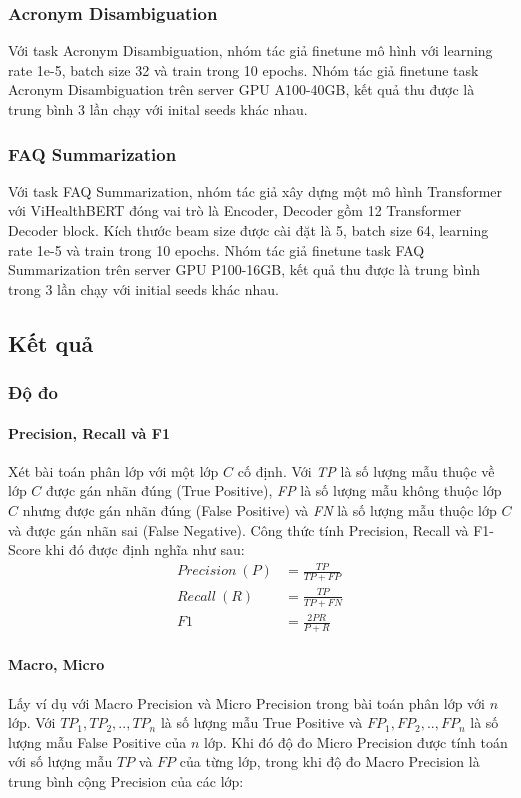 \subsubsection{Acronym Disambiguation}
Với task Acronym Disambiguation, nhóm tác giả finetune mô hình với learning rate 1e-5, batch size 32 và train trong 10 epochs. Nhóm tác giả finetune task Acronym Disambiguation trên server GPU A100-40GB, kết quả thu được là trung bình 3 lần chạy với inital seeds khác nhau.

\subsubsection{FAQ Summarization}
Với task FAQ Summarization, nhóm tác giả xây dựng một mô hình Transformer với ViHealthBERT đóng vai trò là Encoder, Decoder gồm 12 Transformer Decoder block. Kích thước beam size được cài đặt là 5, batch size 64, learning rate 1e-5 và train trong 10 epochs. Nhóm tác giả finetune task FAQ Summarization trên server GPU P100-16GB, kết quả thu được là trung bình trong 3 lần chạy với initial seeds khác nhau. 

\subsection{Kết quả}
\subsubsection{Độ đo}
\paragraph{Precision, Recall và F1}
Xét bài toán phân lớp với một lớp $C$ cố định. Với \textit{TP} là số lượng mẫu thuộc về lớp $C$ được gán nhãn đúng (True Positive), \textit{FP} là số lượng mẫu không thuộc lớp $C$ nhưng được gán nhãn đúng (False Positive) và \textit{FN} là số lượng mẫu thuộc lớp $C$ và được gán nhãn sai (False Negative). Công thức tính Precision, Recall và F1-Score khi đó được định nghĩa như sau:
\begin{equation}
\begin{aligned}
Precision~(P) &= \frac{TP}{TP + FP} \\
Recall~(R) &= \frac{TP}{TP + FN} \\
F1 &= \frac{2PR}{P + R}
\end{aligned}
\end{equation}

\paragraph{Macro, Micro} Lấy ví dụ với Macro Precision và Micro Precision trong bài toán phân lớp với $n$ lớp. Với $TP_1, TP_2, .., TP_n$ là số lượng mẫu True Positive và $FP_1, FP_2, .., FP_n$ là số lượng mẫu False Positive của $n$ lớp. Khi đó độ đo Micro Precision được tính toán với số lượng mẫu $TP$ và $FP$ của từng lớp, trong khi độ đo Macro Precision là trung bình cộng Precision của các lớp:

